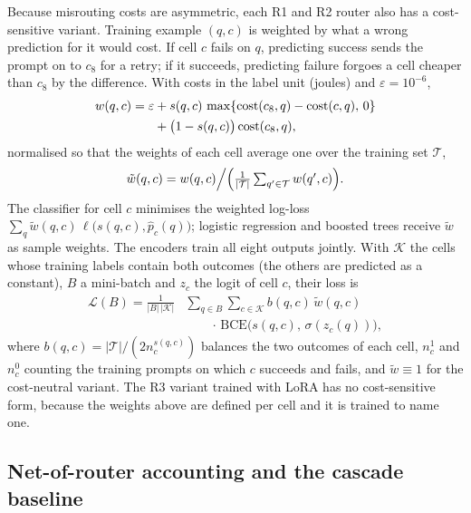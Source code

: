Because misrouting costs are asymmetric, each R1 and R2 router also has a
cost-sensitive variant. Training example $(q, c)$ is weighted by what a wrong
prediction for it would cost. If cell $c$ fails on $q$, predicting success
sends the prompt on to $c_8$ for a retry; if it succeeds, predicting failure
forgoes a cell cheaper than $c_8$ by the difference. With costs in the label
unit (joules) and $\varepsilon = 10^{-6}$,
\begin{equation}
  \begin{split}
    w(q, c) = \varepsilon &+ s(q, c)\,\max\{\mathrm{cost}(c_8, q) - \mathrm{cost}(c, q),\, 0\}\\
    &+ \bigl(1 - s(q, c)\bigr)\,\mathrm{cost}(c_8, q),
  \end{split}
  \label{eq:csweight}
\end{equation}
normalised so that the weights of each cell average one over the training set
$\mathcal{T}$,
\begin{equation}
  \tilde{w}(q, c) = w(q, c) \Big/ \Bigl(\tfrac{1}{|\mathcal{T}|}
  \textstyle\sum_{q' \in \mathcal{T}} w(q', c)\Bigr).
  \label{eq:csnorm}
\end{equation}
The classifier for cell $c$ minimises the weighted log-loss
$\sum_{q} \tilde{w}(q, c)\, \ell\bigl(s(q, c), \hat{p}_c(q)\bigr)$; logistic
regression and boosted trees receive $\tilde{w}$ as sample weights. The
encoders train all eight outputs jointly. With $\mathcal{K}$ the cells whose
training labels contain both outcomes (the others are predicted as a
constant), $B$ a mini-batch and $z_c$ the logit of cell $c$, their loss is
\begin{equation}
  \begin{split}
    \mathcal{L}(B) = \frac{1}{|B|\,|\mathcal{K}|}
    &\sum_{q \in B} \sum_{c \in \mathcal{K}}
    b(q, c)\, \tilde{w}(q, c)\\
    &\qquad\cdot\,\mathrm{BCE}\bigl(s(q, c),\, \sigma(z_c(q))\bigr),
  \end{split}
  \label{eq:encloss}
\end{equation}
where $b(q, c) = |\mathcal{T}| / (2 n_{c}^{s(q,c)})$ balances the two outcomes
of each cell, $n_c^{1}$ and $n_c^{0}$ counting the training prompts on which
$c$ succeeds and fails, and $\tilde{w} \equiv 1$ for the cost-neutral variant.
The R3 variant trained with LoRA has no cost-sensitive form, because the
weights above are defined per cell and it is trained to name one.

\subsection{Net-of-router accounting and the cascade baseline}
\label{sec:net}

